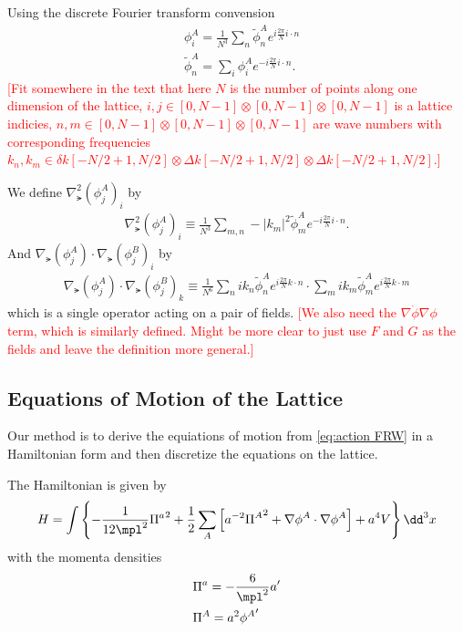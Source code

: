 Using the discrete Fourier transform convension
\begin{align}
  &\phi^A_i = \frac{1}{N^3}\sum_n\tilde{\phi}^A_n e^{i\frac{2\pi}{N}i\cdot n} \\
  &\tilde{\phi}^A_n = \sum_i\phi^A_i e^{-i\frac{2\pi}{N}i\cdot n}.
\end{align}
\textcolor{red}{[Fit somewhere in the text that here $N$ is the number of points along one dimension of the lattice, $i,j \in [0,N-1]\otimes[0,N-1]\otimes[0,N-1]$ is a lattice indicies,  $n,m \in [0,N-1]\otimes[0,N-1]\otimes[0,N-1]$ are wave numbers with corresponding frequencies $k_n,k_m \in \delta k [-N/2+1,N/2] \otimes \Delta k [-N/2+1,N/2] \otimes \Delta k [-N/2+1,N/2]$.]}

We define $\nabla^2_\lat(\phi^A_j)_i$ by
\begin{align} \label{eq:laplacian}
  \nabla^2_\lat(\phi^A_j)_i \equiv \frac{1}{N^3} \sum_{m,n} -|k_m|^2 \tilde{\phi}^A_m e^{-i\frac{2\pi}{N}i\cdot n}.
\end{align}
And $\nabla_\lat(\phi^A_j)\cdot\nabla_\lat(\phi^B_j)_i$ by 
\begin{align} \label{eq:grad dot grad}
  \nabla_\lat(\phi^A_j)\cdot\nabla_\lat(\phi^B_j)_k \equiv
  \frac{1}{N^6}\sum_nik_n\tilde{\phi}^A_ne^{i\frac{2\pi}{N}k\cdot n}\cdot\sum_mik_m\tilde{\phi}^A_me^{i\frac{2\pi}{N}k\cdot m}
\end{align}
which is a single operator acting on a pair of fields.
\textcolor{red}{[We also need the $\nabla\dot{\phi}\nabla\phi$ term, which is similarly defined. Might be more clear to just use $F$ and $G$ as the fields and leave the definition more general.]}

\subsection{Equations of Motion of the Lattice}
Our method is to derive the equiations of motion from \eqref{eq:action FRW} in a Hamiltonian form and then discretize the equations on the lattice.

The Hamiltonian is given by
\begin{equation}
  H = \int\left\{
    - \frac{1}{12\mpl^2}{\Pi^a}^2
    + \frac{1}{2}\sum_A\left[a^{-2}{\Pi^A}^2 + \nabla\phi^A\cdot\nabla\phi^A\right]
    + a^4V
    \right\}\dd^3x
\end{equation}
with the momenta densities
\begin{align}
  & \Pi^a = -\frac{6}{\mpl^2}a'\\
  & \Pi^A = a^2{\phi^A}'
\end{align}

